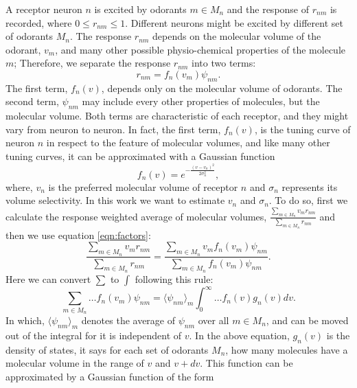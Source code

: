\documentclass[11pt]{paper} %
\begin{document}
A receptor neuron $n$ is excited by odorants $m \in M_n$ and the response of $r_{nm}$ is recorded, where $0 \le r_{nm} \le 1$. 
Different neurons might be excited by different set of odorants $M_n$. 
The response $r_{nm}$ depends on the molecular volume of the odorant, $v_m$, 
and many other possible physio-chemical properties of the molecule $m$; 
Therefore, we separate the response $r_{nm}$ into two terms:
\begin{equation}
r_{nm} = f_n(v_m) \psi_{nm}.
\label{eqn:factors}
\end{equation}
The first term, $f_n(v)$, depends only on the molecular volume of odorants.
The second term, $\psi_{nm}$ may include every other properties of molecules, but the molecular volume.
Both terms are characteristic of each receptor, and they might vary from neuron to neuron.
In fact, the first term, $f_n(v)$, is the tuning curve of neuron $n$ in respect to the feature of molecular volumes, 
and like many other tuning curves, it can be approximated with a Gaussian function
\begin{equation}
\displaystyle f_n(v) = e^{-\frac{(v-v_n)^2}{2\sigma^2_n}}, 
\end{equation}
where, $v_n$ is the preferred molecular volume of receptor $n$ and $\sigma_n$ represents its volume selectivity. 
In this work we want to estimate $v_n$ and $\sigma_n$. 
To do so, first we calculate the response weighted average of molecular volumes, 
$\frac{\sum_{m\in M_n} v_m r_{nm}}{\sum_{m\in M_n} r_{nm}}$ and then we use equation \ref{eqn:factors}:
\begin{equation}
\frac{\displaystyle \sum_{m\in M_n} v_m r_{nm}}{\displaystyle \sum_{m\in M_n} r_{nm}} = \frac{\displaystyle \sum_{m\in M_n} v_m f_n(v_m) \psi_{nm}}{\displaystyle \sum_{m\in M_n} f_n(v_m) \psi_{nm}}.
\label{eqn:sta}
\end{equation}
Here we can convert $\sum$ to $\int$ following this rule:
\begin{equation}
\sum_{m\in M_n} \dots f_n(v_m) \psi_{nm} =  \langle \psi_{nm} \rangle_m \int_0^\infty \dots f_n(v) g_n(v)  dv. 
\label{eqn:sigma_to_int}
\end{equation}
In which, 
$\langle \psi_{nm} \rangle_m$ denotes the average of $\psi_{nm}$ over all $m \in M_n$, 
and can be moved out of the integral for it is independent of $v$.
In the above equation, 
$g_n(v)$ is the density of states, it says for each set of odorants $M_n$, how many molecules have a molecular volume in the range of $v$ and $v+dv$.
This function can be approximated by a Gaussian function of the form 
\end{document}

